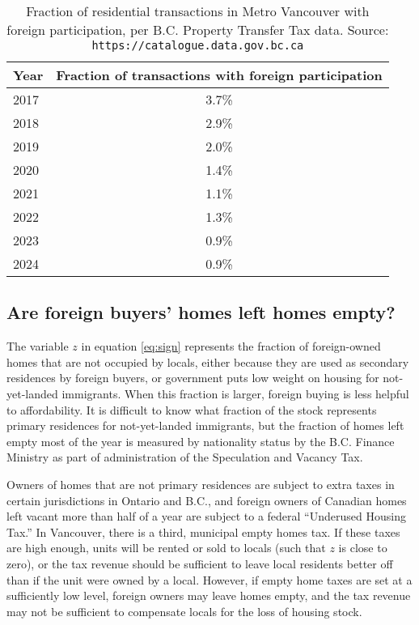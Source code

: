 \documentclass[12pt]{article}
\begin{document}
\begin{table}
	\caption{\label{tab:fbt} Fraction of residential transactions in Metro Vancouver with foreign participation, per B.C. Property Transfer Tax data. Source: \texttt{https://catalogue.data.gov.bc.ca}}
	\begin{tabular}{lc}
		\hline
		Year & Fraction of transactions with foreign participation \\
		\hline\hline
		2017 & 3.7\% \\
		2018 & 2.9\% \\
		2019 & 2.0\%\\
		2020 & 1.4\%\\
		2021 & 1.1\%\\
		2022 & 1.3\%\\
		2023 & 0.9\%\\
		2024 & 0.9\%\\
		\hline
	\end{tabular}
\end{table}

\subsection{Are foreign buyers' homes left homes empty?}

The variable $z$ in equation \eqref{eq:sign} represents the fraction of
foreign-owned homes that are not occupied by locals, either because they are
used as secondary residences by foreign buyers, or government puts low weight
on housing for not-yet-landed immigrants. When this fraction is larger, foreign
buying is less helpful to affordability. It is difficult to know what fraction
of the stock represents primary residences for not-yet-landed immigrants, but
the fraction of homes left empty most of the year is measured by nationality
status by the B.C. Finance Ministry as part of administration  of the
Speculation and Vacancy Tax.

Owners of homes that are not primary residences are subject to extra taxes in
certain jurisdictions in Ontario and B.C., and foreign owners of Canadian homes
left vacant more than half of a year are subject to a federal ``Underused
Housing Tax.'' In Vancouver, there is a third, municipal empty homes tax. If
these taxes are high enough, units will be rented or sold to locals (such that
$z$ is close to zero), or the tax revenue should be sufficient to leave local
residents better off than if the unit were owned by a local. However, if empty
home taxes are set at a sufficiently low level, foreign owners may leave homes
empty, and the tax revenue may not be sufficient to compensate locals for the
loss of housing stock.
\end{document}
